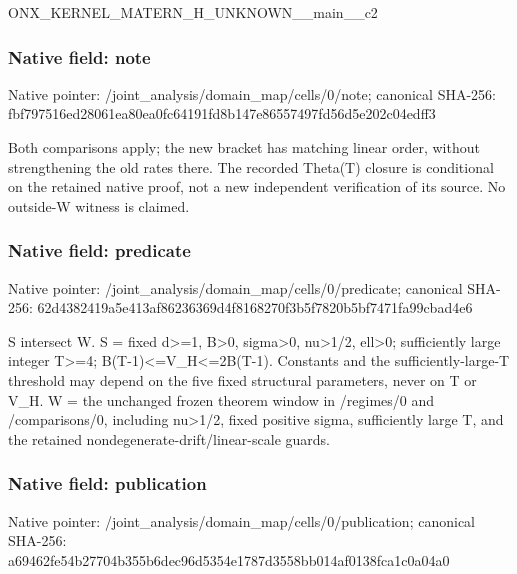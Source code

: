 \documentclass[10pt,a4paper]{article}
\begin{document}
\begingroup\raggedright\sloppy ONX\_\allowbreak{}KERNEL\_\allowbreak{}MATERN\_\allowbreak{}H\_\allowbreak{}UNKNOWN\_\allowbreak{}\_\allowbreak{}main\_\allowbreak{}\_\allowbreak{}c2\par\endgroup

\subsubsection{Native field: note}
Native pointer: /joint\_\allowbreak{}analysis/domain\_\allowbreak{}map/cells/0/note; canonical SHA-256: fbf797516ed28061ea80ea0fc64191fd8b147e86557497fd56d5e202c04edff3

\begingroup\raggedright\sloppy Both comparisons apply;\allowbreak{} the new bracket has matching linear order,\allowbreak{} without strengthening the old rates there. The recorded Theta(T) closure is conditional on the retained native proof,\allowbreak{} not a new independent verification of its source. No outside-W witness is claimed.\par\endgroup

\subsubsection{Native field: predicate}
Native pointer: /joint\_\allowbreak{}analysis/domain\_\allowbreak{}map/cells/0/predicate; canonical SHA-256: 62d4382419a5e413af86236369d4f8168270f3b5f7820b5bf7471fa99cbad4e6

\begingroup\raggedright\sloppy S intersect W. S =\allowbreak{} fixed d>=\allowbreak{}1,\allowbreak{} B>0,\allowbreak{} sigma>0,\allowbreak{} nu>1/\allowbreak{}2,\allowbreak{} ell>0;\allowbreak{} sufficiently large integer T>=\allowbreak{}4;\allowbreak{} B(T-1)<=\allowbreak{}V\_\allowbreak{}H<=\allowbreak{}2B(T-1). Constants and the sufficiently-large-T threshold may depend on the five fixed structural parameters,\allowbreak{} never on T or V\_\allowbreak{}H. W =\allowbreak{} the unchanged frozen theorem window in /\allowbreak{}regimes/\allowbreak{}0 and /\allowbreak{}comparisons/\allowbreak{}0,\allowbreak{} including nu>1/\allowbreak{}2,\allowbreak{} fixed positive sigma,\allowbreak{} sufficiently large T,\allowbreak{} and the retained nondegenerate-drift/\allowbreak{}linear-scale guards.\par\endgroup

\subsubsection{Native field: publication}
Native pointer: /joint\_\allowbreak{}analysis/domain\_\allowbreak{}map/cells/0/publication; canonical SHA-256: a69462fe54b27704b355b6dec96d5354e1787d3558bb014af0138fca1c0a04a0
\end{document}
